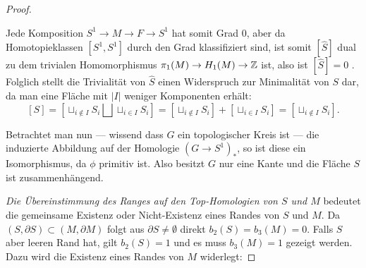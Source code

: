\begin{proof}
\begin{center}
\end{center}

	  Jede Komposition $S^1 \to M \to F \to S^1$ hat somit Grad 0, aber da Homotopieklassen $[S^1,S^1]$ durch den Grad klassifiziert sind, ist somit $[\hat S]$ dual zu dem trivialen Homomorphismus $\pi_1(M) \to H_1(M) \to \mathbb{Z}$ ist, also ist $[\hat S] = 0$ . Folglich stellt die Trivialität von $\hat S$ einen Widerspruch zur Minimalität von $S$ dar, da man eine Fläche mit $|I|$ weniger Komponenten erhält:
	 \[
	 	[S]=[\sqcup_{i\not \in I} S_i\bigsqcup \sqcup_{i\in I} S_i] = [\sqcup_{i\not \in I} S_i ]+[ \sqcup_{i\in I} S_i] = [\sqcup_{i\not \in I}S_i].
	 \]

	 Betrachtet man nun --- wissend dass $G$ ein topologischer Kreis ist --- die induzierte Abbildung auf der Homologie $(G\to S^1)_*$, so ist diese ein Isomorphismus, da $\phi$ primitiv ist. Also besitzt $G$ nur eine Kante und die Fläche $S$ ist zusammenhängend.

	 \emph{Die Übereinstimmung des Ranges auf den Top-Homologien von $S$ und $M$} bedeutet die gemeinsame Existenz oder Nicht-Existenz eines Randes von $S$ und $M$. Da $(S,\partial S) \subset (M,\partial M)$ folgt aus $\partial S \neq \emptyset$ direkt $b_2(S)=b_3(M)=0$. Falls $S$ aber leeren Rand hat, gilt $b_2(S)=1$ und es muss $b_3(M)=1$ gezeigt werden. Dazu wird die Existenz eines Randes von $M$ widerlegt:


\end{proof}
